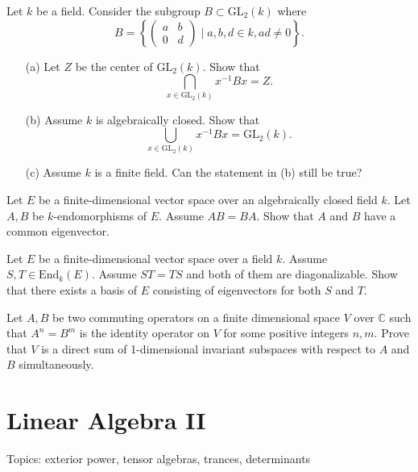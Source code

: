 \begin{prob}[S2008-Q1]
    Let \(k\) be a field. Consider the subgroup \(B \subset \text{GL}_2(k)\) where
    \[B = \left\{ \begin{pmatrix} a & b \\ 0 & d \end{pmatrix} \mid a, b, d \in k, ad \neq 0 \right\}.\]
    \begin{itemize}
        \item[(a)] Let \(Z\) be the center of \(\text{GL}_2(k)\). Show that
        \[\bigcap_{x \in \text{GL}_2(k)} x^{-1} Bx = Z.\]
        \item[(b)] Assume \(k\) is algebraically closed. Show that
        \[\bigcup_{x \in \text{GL}_2(k)} x^{-1} Bx = \text{GL}_2(k).\]
        \item[(c)] Assume \(k\) is a finite field. Can the statement in (b) still be true?
    \end{itemize}
\end{prob}

\begin{prob}[S2009-Q4]
    Let \(E\) be a finite-dimensional vector space over an algebraically closed field \(k\). Let \(A, B\) be \(k\)-endomorphisms of \(E\). Assume \(AB = BA\). Show that \(A\) and \(B\) have a common eigenvector.
\end{prob}


\begin{prob}[F2005-Q6]
    Let \(E\) be a finite-dimensional vector space over a field \(k\). Assume \(S, T \in \text{End}_k(E)\). Assume \(ST = TS\) and both of them are diagonalizable. Show that there exists a basis of \(E\) consisting of eigenvectors for both \(S\) and \(T\).
\end{prob}

\begin{prob}[S2015-Q2]
    Let \(A,B\) be two commuting operators on a finite dimensional space \(V\) over \(\mathbb{C}\) such that \(A^{n}=B^{m}\) is the identity operator on \(V\) for some positive integers \(n,m\). Prove that \(V\) is a direct sum of 1-dimensional invariant subspaces with respect to \(A\) and \(B\) simultaneously.
\end{prob}






\chapter{Linear Algebra II}
Topics: exterior power, tensor algebras, trances, determinants

